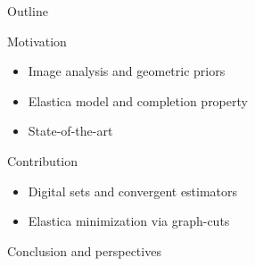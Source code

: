 \begin{frame}
	{Outline}

\begin{enumerate}
	{
	\item{Motivation}
	\begin{itemize}
		\item{Image analysis and geometric priors}
		\item{Elastica model and completion property}		
		\item{State-of-the-art}							
	\end{itemize}}
	\vspace{1em}
	\item{Contribution}
	\begin{itemize}
		\item{Digital sets and convergent estimators}		
		\item{Elastica minimization via graph-cuts}	
	\end{itemize}
	\vspace{1em}
	\item{Conclusion and perspectives}
\end{enumerate}
\end{frame}
